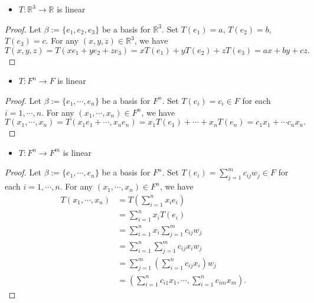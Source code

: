 \begin{Exercise}
\begin{itemize}
\item $T:\mathbb{R}^3\to\mathbb{R}$ is linear
\end{itemize}
\begin{proof}
Let $\beta := \{e_1, e_2, e_3\}$ be a basis for $\mathbb{R}^3$.
Set $T(e_1) = a$, $T(e_2) = b$, $T(e_3) = c$.
For any $(x,y,z)\in\mathbb{R}^3$, we have
$$
T(x,y,z) 
= T(x e_1+y e_2+z e_3) 
= x T(e_1)+y T(e_2)+ z T(e_3)
= a x+b y+c z.
$$
\end{proof}

\begin{itemize}
\item $T:F^n\to F$ is linear
\end{itemize}
\begin{proof}
Let $\beta := \{e_1, \cdots, e_n\}$ be a basis for $F^n$.
Set $T(e_i) = c_i\in F$ for each $i=1,\cdots,n$.
For any $(x_1,\cdots,x_n)\in F^n$, we have
$$
T(x_1, \cdots, x_n)
= T(x_1 e_1+\cdots, x_n e_n)
= x_1 T(e_1)+\cdots+x_n T(e_n)
= c_1 x_1 + \cdots c_n x_n.
$$
\end{proof}

\begin{itemize}
\item $T:F^n\to F^m$ is linear
\end{itemize}
\begin{proof}
Let $\beta := \{e_1, \cdots, e_n\}$ be a basis for $F^n$.
Set $T(e_i) = \sum_{j=1}^{m} c_{i j} w_j\in F$ for each $i=1,\cdots,n$.
For any $(x_1,\cdots,x_n)\in F^n$, we have
\begin{align*}
T(x_1,\cdots, x_n)
&= T\left( \sum_{i=1}^{n} x_i e_i \right) \\
&= \sum_{i=1}^{n} x_i T(e_i) \\
&= \sum_{i=1}^{n} x_i \sum_{j=1}^{m} c_{i j} w_j \\
&= \sum_{i=1}^{n} \sum_{j=1}^{m} c_{i j} x_i w_j \\
&= \sum_{j=1}^{m} \left( \sum_{i=1}^{n} c_{i j} x_i \right) w_j \\
&= (\sum_{i=1}^{n} c_{i 1} x_1, \cdots, \sum_{i=1}^{n} c_{i m} x_m).
\end{align*}
\end{proof}
\end{Exercise}